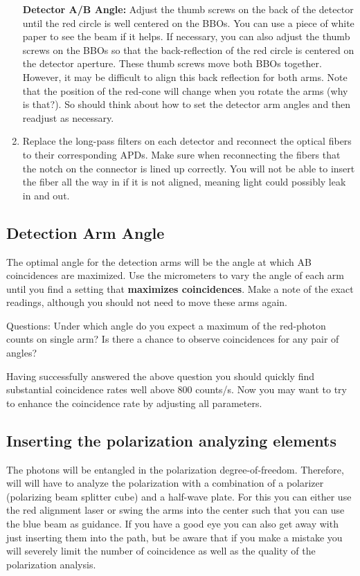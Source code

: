 \documentclass{../lab}
\begin{document}
\begin{enumerate}
    \textbf{Detector A/B Angle:} Adjust the thumb screws on the back of the detector until the red circle is well centered on the BBOs. You can use a piece of white paper to see the beam if it helps. If necessary, you can also adjust the thumb screws on the BBOs so that the back-reflection of the red circle is centered on the detector aperture. These thumb screws move both BBOs together. However, it may be difficult to align this back reflection for both arms. Note that the position of the red-cone will change when you rotate the arms (why is that?). So should think about how to set the detector arm angles and then readjust as necessary.

    \item Replace the long-pass filters on each detector and reconnect the optical fibers to their corresponding APDs. Make sure when reconnecting the fibers that the notch on the connector is lined up correctly. You will not be able to insert the fiber all the way in if it is not aligned, meaning light could possibly leak in and out.

\end{enumerate}

\subsection{Detection Arm Angle}

The optimal angle for the detection arms will be the angle at which AB coincidences are maximized. Use the micrometers to vary the angle of each arm until you find a setting that \textbf{maximizes coincidences}. Make a note of the exact readings, although you should not need to move these arms again.

Questions: Under which angle do you expect a maximum of the red-photon counts on single arm? Is there a chance to observe coincidences for any pair of angles?

Having successfully answered the above question you should quickly find substantial coincidence rates well above 800 counts/s. Now you may want to try to enhance the coincidence rate by adjusting all parameters.

\subsection{Inserting the polarization analyzing elements}

The photons will be entangled in the polarization degree-of-freedom. Therefore, will will have to analyze the polarization with a combination of a polarizer (polarizing beam splitter cube) and a half-wave plate. For this you can either use the red alignment laser or swing the arms into the center such that you can use the blue beam as guidance. If you have a good eye you can also get away with just inserting them into the path, but be aware that if you make a mistake you will severely limit the number of coincidence as well as the quality of the polarization analysis.
\end{document}
